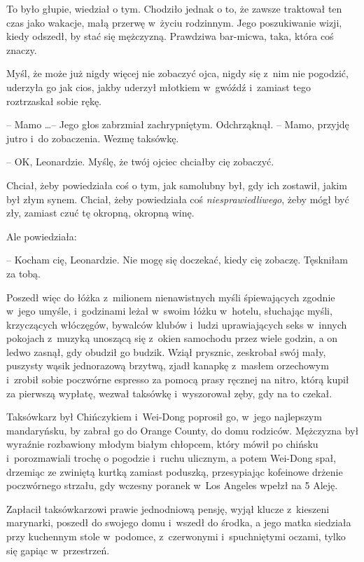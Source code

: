 \documentclass[oneside,polish,11pt,rmheadings]{mwbk}
\begin{document}
To było głupie, wiedział o tym. Chodziło jednak o to, że zawsze traktował ten czas jako wakacje, małą przerwę w~życiu rodzinnym. Jego poszukiwanie wizji, kiedy odszedł, by stać się mężczyzną. Prawdziwa bar-micwa, taka, która coś znaczy.

Myśl, że może już nigdy więcej nie zobaczyć ojca, nigdy się z~nim nie pogodzić, uderzyła go jak cios, jakby uderzył młotkiem w~gwóźdź i~zamiast tego roztrzaskał sobie rękę.

-- Mamo \ldots  -- Jego głos zabrzmiał zachrypniętym. Odchrząknął. -- Mamo, przyjdę jutro i~do zobaczenia. Wezmę taksówkę.

-- OK, Leonardzie. Myślę, że twój ojciec chciałby cię zobaczyć.

Chciał, żeby powiedziała coś o tym, jak samolubny był, gdy ich zostawił, jakim był złym synem. Chciał, żeby powiedziała coś \textit{niesprawiedliwego}, żeby mógł być zły, zamiast czuć tę okropną, okropną winę.

Ale powiedziała: 

-- Kocham cię, Leonardzie. Nie mogę się doczekać, kiedy cię zobaczę. Tęskniłam za tobą.

Poszedł więc do łóżka z~milionem nienawistnych myśli śpiewających zgodnie w~jego umyśle, i~godzinami leżał w~swoim łóżku w~hotelu, słuchając myśli, krzyczących włóczęgów, bywalców klubów i~ludzi uprawiających seks w~innych pokojach z~muzyką unoszącą się z~okien samochodu przez wiele godzin, a on ledwo zasnął, gdy obudził go budzik. Wziął prysznic, zeskrobał swój mały, puszysty wąsik jednorazową brzytwą, zjadł kanapkę z~masłem orzechowym i~zrobił sobie poczwórne espresso za pomocą prasy ręcznej na nitro, którą kupił za pierwszą wypłatę, wezwał taksówkę i~wyszorował zęby, gdy na to czekał.

Taksówkarz był Chińczykiem i~Wei-Dong poprosił go, w~jego najlepszym mandaryńsku, by zabrał go do Orange County, do domu rodziców. Mężczyzna był wyraźnie rozbawiony młodym białym chłopcem, który mówił po chińsku i~porozmawiali trochę o pogodzie i~ruchu ulicznym, a potem Wei-Dong spał, drzemiąc ze zwiniętą kurtką zamiast poduszką, przesypiając kofeinowe drżenie poczwórnego strzału, gdy wczesny poranek w~Los Angeles wpełzł na 5 Aleję.

Zapłacił taksówkarzowi prawie jednodniową pensję, wyjął klucze z~kieszeni marynarki, poszedł do swojego domu i~wszedł do środka, a jego matka siedziała przy kuchennym stole w~podomce, z~czerwonymi i~spuchniętymi oczami, tylko się gapiąc w~przestrzeń.
\end{document}

